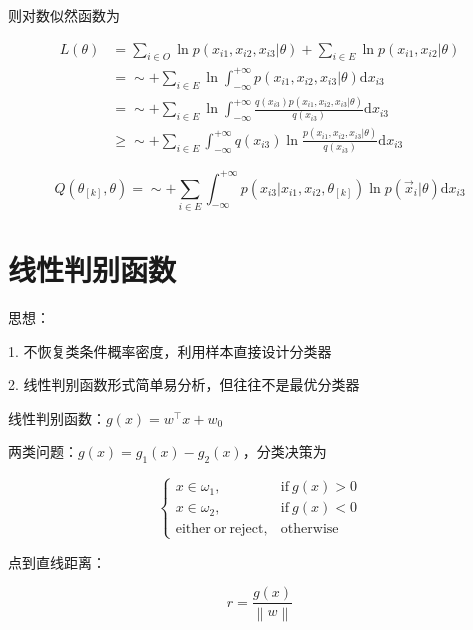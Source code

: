 \documentclass[openany,a4paper,12pt]{ctexbook}
\theoremstyle{kaiti}
\theoremstyle{normal}
\begin{document}
则对数似然函数为

\begin{equation}
\begin{aligned}
  L(\theta)
  &=\sum_{i\in O}\ln p\left(x_{i1},x_{i2},x_{i3}|\theta \right)+\sum_{i\in E}\ln p\left(x_{i1},x_{i2}|\theta \right)\\
  &=\sim +\sum_{i\in E}\ln \int_{-\infty}^{+\infty}p\left(x_{i1},x_{i2},x_{i3}|\theta \right)\mathrm{d}x_{i3}\\
  &=\sim +\sum_{i\in E}\ln \int_{-\infty}^{+\infty}\frac{q\left(x_{i3} \right)p\left(x_{i1},x_{i2},x_{i3}|\theta \right)}{q\left(x_{i3} \right)}\mathrm{d}x_{i3}\\
  &\geqslant \sim +\sum_{i\in E}\int_{-\infty}^{+\infty}q\left(x_{i3} \right)\ln\frac{p\left(x_{i1},x_{i2},x_{i3}|\theta \right)}{q\left(x_{i3} \right)} \mathrm{d}x_{i3}
\end{aligned}
\end{equation}

\begin{equation}
Q\left(\theta_{\left[k \right]},\theta \right)=\sim +\sum_{i\in E}\int_{-\infty}^{+\infty}p\left(x_{i3}|x_{i1},x_{i2},\theta_{\left[k \right]} \right)\ln p\left(\vec{x}_i|\theta \right)\mathrm{d}x_{i3}
\end{equation}

\chapter{线性判别函数}

思想：

1. 不恢复类条件概率密度，利用样本直接设计分类器

2. 线性判别函数形式简单易分析，但往往不是最优分类器

线性判别函数：$g(x)=w^{\top}x+w_0$

两类问题：$g(x)=g_1(x)-g_2(x)$，分类决策为

\begin{equation}
\begin{cases}
  x\in \omega_1, &\mathrm{if}~g(x)>0\\
  x\in \omega_2, &\mathrm{if}~g(x)<0\\
  \mathrm{either}~\mathrm{or}~\mathrm{reject}, &\mathrm{otherwise}
\end{cases}
\end{equation}

点到直线距离：

\begin{equation}
r=\frac{g(x)}{\left\| w \right\|}
\end{equation}
\end{document}
